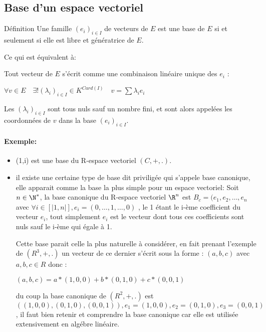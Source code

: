 \documentclass{book}
\begin{document}
\subsection{Base d'un espace vectoriel}
\begin{Définition}[]{Définition}{}
Une famille ${\displaystyle (e_{i})_{i\in I}}$ de vecteurs de ${\displaystyle E}$ est une base de ${\displaystyle E}$ si et seulement si elle est libre et génératrice de ${\displaystyle E}$.

Ce qui est équivalent à:

Tout vecteur de ${\displaystyle E}$ s'écrit comme une combinaison linéaire unique des ${\displaystyle e_{i}}$ :
\begin{framed}
${\displaystyle \forall v\in E\quad \exists !(\lambda _{i})_{i\in I}\in K^{Card(I)}\quad v=\sum \lambda _{i}e_{i}}$
\end{framed}
Les ${\displaystyle (\lambda _{i})_{i\in I}}$ sont tous nuls sauf un nombre fini, et sont alors appelées les coordonnées de ${\displaystyle v}$ dans la base ${\displaystyle (e_{i})_{i\in I}}$.
\end{Définition}
\paragraph{Exemple:}
\begin{itemize}
    \item (1,i) est une base du R-espace vectoriel \((C,+,.)\).
    \item il existe une certaine type de base dit priviligée qui s'appele base canonique, elle apparait comme la base la plus simple pour un espace vectoriel:
    Soit \(n \in \N^*\), la base canonique du R-espace vectoriel \(\R^n\) est \(B_c=(e_1,e_2,\dots, e_n\) avec 
    \(\forall i \in [|1,n|], e_i=(0,\dots,1,\dots,0)\) , le 1 étant le i-ème coefficient du vecteur \(e_i\), tout simplement \(e_i\) est le vecteur dont tous ces coefficients sont nuls sauf le i-ème qui égale à 1.

    Cette base parait celle la plus naturelle à considérer, en fait prenant l'exemple de \((R^3,+,.)\) un vecteur de ce dernier s'écrit sous la forme : \((a,b,c)\) avec \(a,b,c \in R\) donc :

    \((a,b,c)=a*(1,0,0)+b*(0,1,0)+c*(0,0,1)\) 

    du coup la base canonique de \((R^2,+,.)\) est \(((1,0,0),(0,1,0),(0,0,1)), e_1=(1,0,0), e_2=(0,1,0), e_3=(0,0,1)\),  il faut bien retenir et comprendre la base canonique car elle est utilisée extensivement en algébre linéaire.
\end{itemize}
\end{document}
